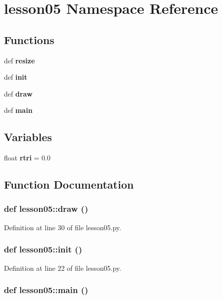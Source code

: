 \section{lesson05 Namespace Reference}
\label{namespacelesson05}


\subsection*{Functions}
\begin{CompactItemize}
\item 
def {\bf resize}
\item 
def {\bf init}
\item 
def {\bf draw}
\item 
def {\bf main}
\end{CompactItemize}
\subsection*{Variables}
\begin{CompactItemize}
\item 
float {\bf rtri} = 0.0
\end{CompactItemize}


\subsection{Function Documentation}
\subsubsection{\setlength{\rightskip}{0pt plus 5cm}def lesson05::draw ()}\label{namespacelesson05_1a8193afaa9ea643f66424ff72dc6363}




Definition at line 30 of file lesson05.py.
\subsubsection{\setlength{\rightskip}{0pt plus 5cm}def lesson05::init ()}\label{namespacelesson05_86b621d68715fc00fbab8babca79dae9}




Definition at line 22 of file lesson05.py.
\subsubsection{\setlength{\rightskip}{0pt plus 5cm}def lesson05::main ()}\label{namespacelesson05_e336ebe6cc0e5a9bd49f1eef43949a3e}




